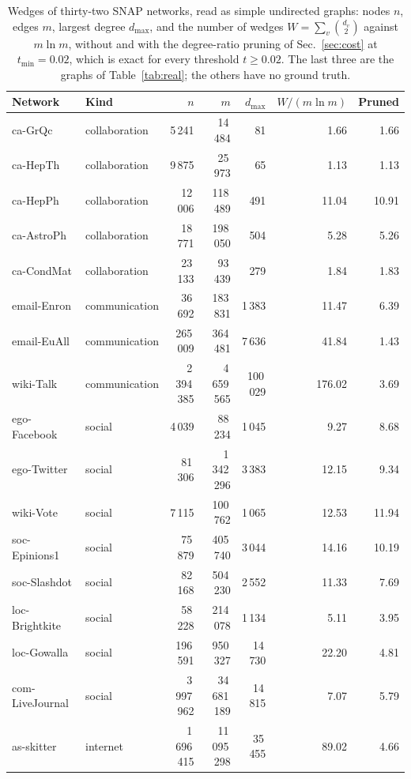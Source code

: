 \begin{table}[h]
\caption{Wedges of thirty-two SNAP networks, read as simple undirected graphs: nodes $n$, edges $m$, largest degree $d_{\max}$, and the number of wedges $W=\sum_v\binom{d_v}{2}$ against $m\ln m$, without and with the degree-ratio pruning of Sec.~\ref{sec:cost} at $t_{\min}=0.02$, which is exact for every threshold $t\ge0.02$. The last three are the graphs of Table~\ref{tab:real}; the others have no ground truth.}
\label{tab:S-wedges}
\begin{ruledtabular}
\begin{tabular}{llrrrrr}
Network & Kind & $n$ & $m$ & $d_{\max}$ & $W/(m\ln m)$ & Pruned \\
\hline
ca-GrQc & collaboration & 5\,241 & 14\,484 & 81 & 1.66 & 1.66 \\
ca-HepTh & collaboration & 9\,875 & 25\,973 & 65 & 1.13 & 1.13 \\
ca-HepPh & collaboration & 12\,006 & 118\,489 & 491 & 11.04 & 10.91 \\
ca-AstroPh & collaboration & 18\,771 & 198\,050 & 504 & 5.28 & 5.26 \\
ca-CondMat & collaboration & 23\,133 & 93\,439 & 279 & 1.84 & 1.83 \\
email-Enron & communication & 36\,692 & 183\,831 & 1\,383 & 11.47 & 6.39 \\
email-EuAll & communication & 265\,009 & 364\,481 & 7\,636 & 41.84 & 1.43 \\
wiki-Talk & communication & 2\,394\,385 & 4\,659\,565 & 100\,029 & 176.02 & 3.69 \\
ego-Facebook & social & 4\,039 & 88\,234 & 1\,045 & 9.27 & 8.68 \\
ego-Twitter & social & 81\,306 & 1\,342\,296 & 3\,383 & 12.15 & 9.34 \\
wiki-Vote & social & 7\,115 & 100\,762 & 1\,065 & 12.53 & 11.94 \\
soc-Epinions1 & social & 75\,879 & 405\,740 & 3\,044 & 14.16 & 10.19 \\
soc-Slashdot & social & 82\,168 & 504\,230 & 2\,552 & 11.33 & 7.69 \\
loc-Brightkite & social & 58\,228 & 214\,078 & 1\,134 & 5.11 & 3.95 \\
loc-Gowalla & social & 196\,591 & 950\,327 & 14\,730 & 22.20 & 4.81 \\
com-LiveJournal & social & 3\,997\,962 & 34\,681\,189 & 14\,815 & 7.07 & 5.79 \\
as-skitter & internet & 1\,696\,415 & 11\,095\,298 & 35\,455 & 89.02 & 4.66 \\

\end{tabular}
\end{ruledtabular}
\end{table}
